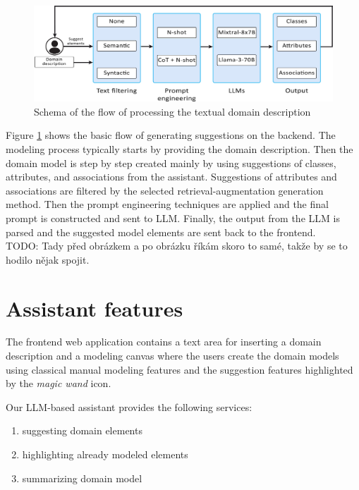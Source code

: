 \begin{figure}[!h]
    \centering
    \includegraphics[scale=0.23]{img/work-flow.jpg}
    \caption{\centering Schema of the flow of processing the textual domain description}
    \label{fig:work-flow}
\end{figure}

Figure \ref{fig:work-flow} shows the basic flow of generating suggestions on the backend. The modeling process typically starts by providing the domain description. Then the domain model is step by step created mainly by using suggestions of classes, attributes, and associations from the assistant. Suggestions of attributes and associations are filtered by the selected retrieval-augmentation generation method. Then the prompt engineering techniques are applied and the final prompt is constructed and sent to LLM. Finally, the output from the LLM is parsed and the suggested model elements are sent back to the frontend. \\

\noindent{}TODO: Tady před obrázkem a po obrázku říkám skoro to samé, takže by se to hodilo nějak spojit.


\section{Assistant features}

The frontend web application contains a text area for inserting a domain description and a modeling canvas where the users create the domain models using classical manual modeling features and the suggestion features highlighted by the \textit{magic wand} icon.

Our LLM-based assistant provides the following services:

\begin{enumerate}
\item suggesting domain elements
\item highlighting already modeled elements
\item summarizing domain model
\end{enumerate}


